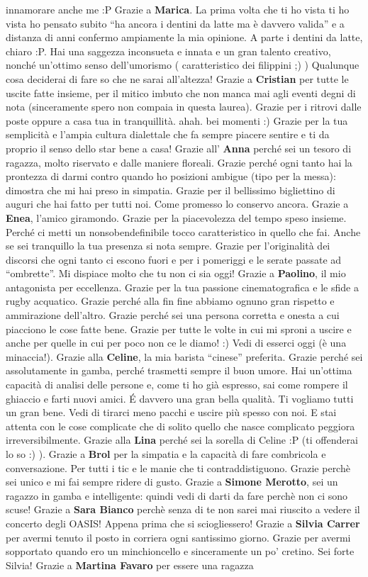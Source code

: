 \documentclass[10pt]{amsart}
\newcommand{\n}[1]{{\Large \bf #1}}
\begin{document}
innamorare anche me :P  Grazie a \n{Marica}. La prima volta che ti ho vista ti ho vista ho pensato subito ``ha ancora i dentini da latte ma è davvero valida'' e a distanza di anni confermo ampiamente la mia opinione. A parte i dentini da latte, chiaro :P. Hai una saggezza inconsueta e innata e un gran talento creativo, nonché un'ottimo senso dell'umorismo ( caratteristico dei filippini ;) ) Qualunque cosa deciderai di fare so che ne sarai all'altezza! Grazie a \n{Cristian} per tutte le uscite fatte insieme, per il mitico imbuto che non manca mai agli eventi degni di nota (sinceramente spero non compaia in questa laurea). Grazie per i ritrovi dalle poste oppure a casa tua in tranquillità. ahah. bei momenti :) Grazie per la tua semplicità e l'ampia cultura dialettale che fa sempre piacere sentire e ti da proprio il senso dello star bene a casa! Grazie all' \n{Anna} perché sei un tesoro di ragazza, molto riservato e dalle maniere floreali. Grazie perché ogni tanto hai la prontezza di darmi contro quando ho posizioni ambigue (tipo per la messa): dimostra che mi hai preso in simpatia. Grazie per il bellissimo bigliettino di auguri che hai fatto per tutti noi. Come promesso lo conservo ancora. Grazie a \n{Enea}, l'amico giramondo. Grazie per la piacevolezza del tempo speso insieme. Perché ci metti un nonsobendefinibile tocco caratteristico in quello che fai. Anche se sei tranquillo la tua presenza si nota sempre. Grazie per l'originalità dei discorsi che ogni tanto ci escono fuori e per i pomeriggi e le serate passate ad ``ombrette''. Mi dispiace molto che tu non ci sia oggi! Grazie a \n{Paolino}, il mio antagonista per eccellenza. Grazie per la tua passione cinematografica e le sfide a rugby acquatico. Grazie perché alla fin fine abbiamo ognuno gran rispetto e ammirazione dell'altro. Grazie perché sei una persona corretta e onesta a cui piacciono le cose fatte bene. Grazie per tutte le volte in cui mi sproni a uscire e anche per quelle in cui per poco non ce le diamo! :) Vedi di esserci oggi (è una minaccia!). Grazie alla \n{Celine}, la mia barista ``cinese'' preferita. Grazie perché sei assolutamente in gamba, perché trasmetti sempre il buon umore. Hai un'ottima capacità di analisi delle persone e, come ti ho già espresso, sai come rompere il ghiaccio e farti nuovi amici. \'E davvero una gran bella qualità. Ti vogliamo tutti un gran bene. Vedi di tirarci meno pacchi e uscire più spesso con noi. E stai attenta con le cose complicate che di solito quello che nasce complicato peggiora irreversibilmente. Grazie alla \n{Lina} perché sei la sorella di Celine :P (ti offenderai lo so :) ). Grazie a \n{Brol} per la simpatia e la capacità di fare combricola e conversazione. Per tutti i tic e le manie che ti contraddistiguono. Grazie perchè sei unico e mi fai sempre ridere di gusto. Grazie a \n{Simone Merotto}, sei un ragazzo in gamba e intelligente: quindi vedi di darti da fare perchè non ci sono scuse! Grazie a \n{Sara Bianco} perchè senza di te non sarei mai riuscito a vedere il concerto degli OASIS! Appena prima che si sciogliessero! Grazie a \n{Silvia Carrer} per avermi tenuto il posto in corriera ogni santissimo giorno. Grazie per avermi sopportato quando ero un minchioncello e sinceramente un po' cretino. Sei forte Silvia! Grazie a \n{Martina Favaro} per essere una ragazza 
\end{document}
